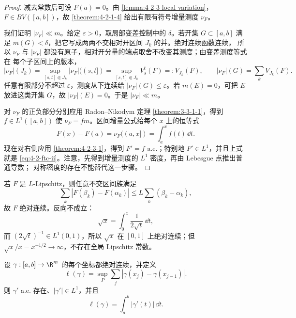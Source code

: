\begin{proof}
减去常数后可设 $F(a)=0$。由
\cref{lemma:4-2-3-local-variation}，$F\in BV([a,b])$，故
\cref{theorem:4-2-1-4} 给出有限有符号增量测度 $\nu_F$。

我们证明 $|\nu_F|\ll m$。给定 $\varepsilon>0$，取局部变差控制中的 $\delta$。若开集
$G\subset[a,b]$ 满足 $m(G)<\delta$，把它写成两两不交相对开区间 $J_k$ 的并。绝对连续函数连续，
所以 $\nu_F$ 与 $|\nu_F|$ 都没有原子，相对开分量的端点取舍不改变其测度；由变差测度等式在
每个子区间上的版本，
\[
 |\nu_F|(J_k)
 =\sup_{[s,t]\Subset J_k}|\nu_F|((s,t])
 =\sup_{[s,t]\Subset J_k}V_s^t(F)=:V_{J_k}(F),
 \qquad
 |\nu_F|(G)=\sum_kV_{J_k}(F).
\]
任意有限部分不超过 $\varepsilon$，测度从下连续给
$|\nu_F|(G)\le\varepsilon$。若 $m(E)=0$，可把 $E$ 放进这类开集 $G$，故
$|\nu_F|(E)=0$。于是 $|\nu_F|\ll m$。

对 $\nu_F$ 的正负部分分别应用 Radon--Nikodym 定理
\cref{theorem:3-3-1-1}，得到 $f\in L^1([a,b])$ 使
$\nu_F=fm$。区间增量公式给每个 $x$ 上的恒等式
\[
 F(x)-F(a)=\nu_F((a,x])=\int_a^xf(t)\,\dd t.
\]
现在对右侧应用 \cref{theorem:4-2-3-1}，得到 $F'=f$ a.e.；特别地 $F'\in L^1$，并且上式就是
\eqref{eq:4-2-ftc-ii}。注意，先得到增量测度的 $L^1$ 密度，再由 Lebesgue 点推出普通导数；
对称密度的存在不能替代这一步骤。
\end{proof}

\begin{example}\label{ex:4-2-3-1}
若 $F$ 是 $L$-Lipschitz，则任意不交区间族满足
\[
 \sum_k|F(\beta_k)-F(\alpha_k)|
 \le L\sum_k(\beta_k-\alpha_k),
\]
故 $F$ 绝对连续。反向不成立：
\[
 \sqrt x=\int_0^x\frac{1}{2\sqrt t}\,\dd t,
\]
而 $(2\sqrt t)^{-1}\in L^1(0,1)$，所以 $\sqrt x$ 在 $[0,1]$ 上绝对连续；但
$\sqrt x/x=x^{-1/2}\to\infty$，不存在全局 Lipschitz 常数。
\end{example}

\begin{proposition}[绝对连续曲线的长度公式]\label{proposition:4-2-3-curve-length}
设 $\gamma:[a,b]\to\R^m$ 的每个坐标都绝对连续，并定义
\[
 \ell(\gamma)=\sup_P\sum_j|\gamma(x_j)-\gamma(x_{j-1})|.
\]
则 $\gamma'$ a.e. 存在、$|\gamma'|\in L^1$，并且
\[
 \ell(\gamma)=\int_a^b|\gamma'(t)|\,\dd t.
\]
\end{proposition}

